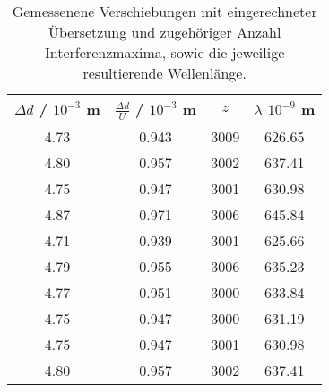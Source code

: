 \begin{table}[!htp]
\centering
\caption{Gemessenene Verschiebungen mit eingerechneter Übersetzung und zugehöriger Anzahl Interferenzmaxima, sowie die jeweilige resultierende Wellenlänge.}
\label{tab:messung1}
\begin{tabular}{c c c c}
\toprule
{$\Delta d$ / $10^{-3}$ m} & {$\frac{\Delta d} {U} $ / $10^{-3}$ m} & {$z$} & {$\lambda$ $10^{-9}$ m} \\
\midrule
4.73 & 0.943 & 3009 & 626.65 \\
4.80 & 0.957 & 3002 & 637.41 \\
4.75 & 0.947 & 3001 & 630.98 \\
4.87 & 0.971 & 3006 & 645.84 \\
4.71 & 0.939 & 3001 & 625.66 \\
4.79 & 0.955 & 3006 & 635.23 \\
4.77 & 0.951 & 3000 & 633.84 \\
4.75 & 0.947 & 3000 & 631.19 \\
4.75 & 0.947 & 3001 & 630.98 \\
4.80 & 0.957 & 3002 & 637.41 \\
\bottomrule
\end{tabular}
\end{table}